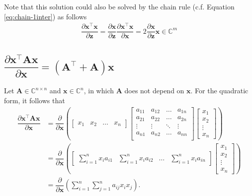 \documentclass{article}
\newcommand{\trans}{\top}
\begin{document}
Note that this solution could also be solved by the chain rule (c.f. Equation \eqref{eq:chain-1inter}) as follows
\begin{align}
    \boxed{\dfrac{\partial \mathbf{x}^\trans \mathbf{x}}{\partial \mathbf{z}} = \dfrac{\partial \mathbf{x}}{\partial \mathbf{z}} \dfrac{\partial \mathbf{x}^\trans \mathbf{x}}{\partial \mathbf{x}} = 2\dfrac{\partial \mathbf{x}}{\partial \mathbf{z}}\mathbf{x} \in \mathbb{C}^m}
\end{align}

\subsection{\(\dfrac{\partial \mathbf{x}^\trans \mathbf{A} \mathbf{x}}{\partial \mathbf{x}} = \left(\mathbf{A}^\trans + \mathbf{A}\right) \mathbf{x}\)}
Let \(\mathbf{A}\in \mathbb{C}^{n\times n}\) and \(\mathbf{x} \in \mathbb{C}^{n}\), in which \(\mathbf{A}\) does not depend on \(\mathbf{x}\). For the quadratic form, it follows that
\begin{align}
    \dfrac{\partial \mathbf{x}^\trans \mathbf{A} \mathbf{x}}{\partial \mathbf{x}} &= \dfrac{\partial}{\partial \mathbf{x}} \left(
    \begin{bmatrix}
        x_{1} & x_{2} & \dots & x_{n}
    \end{bmatrix}
    \begin{bmatrix}
        a_{11} & a_{12} & \dots & a_{1n} \\
        a_{21} & a_{22} & \dots & a_{2n} \\
        \vdots & \vdots & \ddots & \vdots \\
        a_{n1} & a_{n2} & \dots & a_{nn} \\
    \end{bmatrix} \begin{bmatrix}
        x_{1} \\ x_{2} \\ \vdots \\ x_{n}
    \end{bmatrix} \right) \\
    &= \dfrac{\partial}{\partial \mathbf{x}} \left(
			\begin{bmatrix}
				\displaystyle \sum_{i = 1}^{n} x_{i}a_{i1} & 
				\displaystyle \sum_{i = 1}^{n} x_{i}a_{i2} & 
				\dots & 
				\displaystyle \sum_{i = 1}^{n} x_{i}a_{in}
			\end{bmatrix} \begin{bmatrix}
				x_{1} \\ x_{2} \\ \vdots \\ x_{n}
			\end{bmatrix} \right) \\
            &= \dfrac{\partial}{\partial \mathbf{x}} \left(
				\sum_{i = 1}^{n}\sum_{j = 1}^{n} a_{ij} x_{i} x_{j}
			\right).
\end{align}
\end{document}
